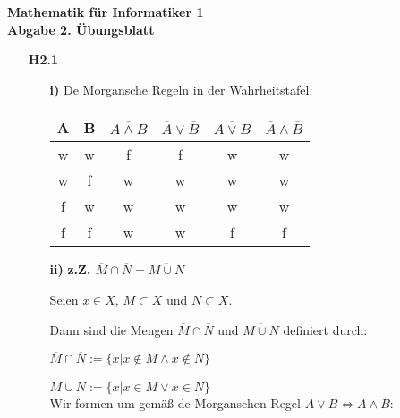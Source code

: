 \documentclass[a4paper,abstract,german]{scrreprt}
\begin{document}
\noindent
{\begin{flushright}
%
%	
\end{flushright}}
\begin{center}
	{\textbf  {Mathematik für Informatiker 1}} \\
	{\textbf {Abgabe 2. Übungsblatt}}
\end{center}\vspace{0.3cm}

%
%
\begin{enumerate}
	
	
	\item[\textbf {H2.1}]
	\begin{enumerate}
	\item[\textbf {i)}]
    	De Morgansche Regeln in der Wahrheitstafel: \\
    	\begin{center}
        \begin{tabular}{||c c | c c | c c ||}
         A & B & $\overline{A \land B}$ & $\overline{A} \lor \overline{B}$ & $\overline{A \lor B}$ & $\overline{A} \land \overline{B} $ \\
         \hline
         w & w & f & f & w & w\\
         w & f & w & w & w & w\\
         f & w & w & w & w & w\\
         f & f & w & w & f & f\\
        \end{tabular}
        \end{center}
    \item[\textbf {ii)}]
    \textbf{z.Z. $\overline{M} \cap \overline{N} = \overline{M \cup N}$}
    
        Seien $x \in X$, $M \subset X$ und $N\subset X$.
        
        Dann sind die Mengen $\overline{M} \cap \overline{N}$ und $\overline{M \cup N}$ definiert durch:
        
        $\overline{M} \cap \overline{N} := \{ x |x \notin M \land x \notin N \}$
        
        $\overline{M \cup N} := \{x|\overline{x \in M \lor x \in N} \}$  \\
        
        Wir formen um gemäß de Morganschen Regel $\overline{A\lor B} \iff \overline{A} \land \overline{B}  $:
        

\end{enumerate}
\end{enumerate}
\end{document}
